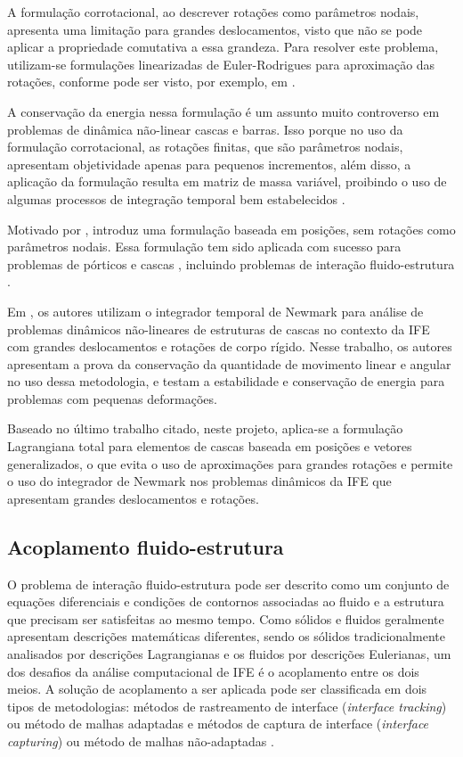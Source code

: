 \documentclass[tese_patricia.tex]{subfiles}
\begin{document}
A formulação corrotacional, ao descrever rotações como parâmetros nodais, apresenta uma limitação para grandes deslocamentos, visto que não se pode aplicar a propriedade comutativa a essa grandeza. Para resolver este problema, utilizam-se formulações linearizadas de Euler-Rodrigues para aproximação das rotações, conforme pode ser visto, por exemplo, em .

A conservação da energia nessa formulação é um assunto muito controverso em problemas de dinâmica não-linear cascas e barras. Isso porque no uso da formulação corrotacional, as rotações finitas, que são parâmetros nodais, apresentam objetividade apenas para pequenos incrementos, além disso, a aplicação da formulação resulta em matriz de massa variável, proibindo o uso de algumas processos de integração temporal bem estabelecidos \cite{SanchesC:2013}.

Motivado por ,  introduz uma formulação baseada em posições, sem rotações como parâmetros nodais. Essa formulação tem sido aplicada com sucesso para problemas de pórticos e cascas \cite{CodaG:2004,CodaP:2010,CarrazedoC:2010,CodaP:2011,SanchesC:2016}, incluindo problemas de interação fluido-estrutura \cite{SanchesC:2013,SanchesC:2014,FernandesCS:2019,AvanciniS:2020}.

Em , os autores utilizam o integrador temporal de Newmark para análise de problemas dinâmicos não-lineares de estruturas de cascas no contexto da IFE com grandes deslocamentos e rotações de corpo rígido. Nesse trabalho, os autores apresentam a prova da conservação da quantidade de movimento linear e angular no uso dessa metodologia, e testam a estabilidade e conservação de energia para problemas com pequenas deformações. 

Baseado no último trabalho citado, neste projeto, aplica-se a formulação Lagrangiana total para elementos de cascas baseada em posições e vetores generalizados, o que evita o uso de aproximações para grandes rotações e permite o uso do integrador de Newmark nos problemas dinâmicos da IFE que apresentam grandes deslocamentos e rotações.

\subsection{Acoplamento fluido-estrutura}
\label{couplingsection}


O problema de interação fluido-estrutura pode ser descrito como um conjunto de equações diferenciais e condições de contornos associadas ao fluido e a estrutura que precisam ser satisfeitas ao mesmo tempo. Como sólidos e fluidos geralmente apresentam descrições matemáticas diferentes, sendo os sólidos tradicionalmente analisados por descrições Lagrangianas e os fluidos por descrições Eulerianas, um dos desafios da análise computacional de IFE é o acoplamento entre os dois meios. A solução de acoplamento a ser aplicada pode ser classificada em dois tipos de metodologias: métodos de rastreamento de interface (\textit{interface tracking}) ou método de malhas adaptadas e métodos de captura de interface (\textit{interface capturing}) ou método de malhas não-adaptadas \cite{Houetal:2012,BazilevsTT:2013b}.
\end{document}
